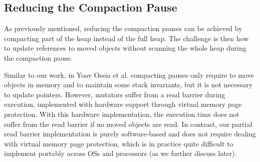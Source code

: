 \documentclass[sigplan,10pt,review,anonymous]{acmart}\settopmatter{printfolios=true,printccs=false,printacmref=false}
\begin{document}
\subsection{Reducing the Compaction Pause}

As previously mentioned, reducing the compaction pauses can be achieved by compacting part of the heap instead of the full heap. The challenge is then how to update references to moved objects without scanning the whole heap during the compaction pause.

Similar to our work, in Yoav Ossia et al. \cite{VirtualMemConcCompact} compacting pauses only require to move objects in memory and to maintain some stack invariants, but it is not necessary to update pointers. 
However, mutators suffer from a read barrier during execution, implemented with hardware support through virtual memory page protection. With this hardware implementation, the execution time does not suffer from the read barrier if no moved objects are read. 
In contrast, our partial read barrier implementation is purely software-based and does not require dealing with virtual memory page protection, which is in practice quite difficult to implement portably across OSs and processors (as we further discuss later). %
\end{document}
